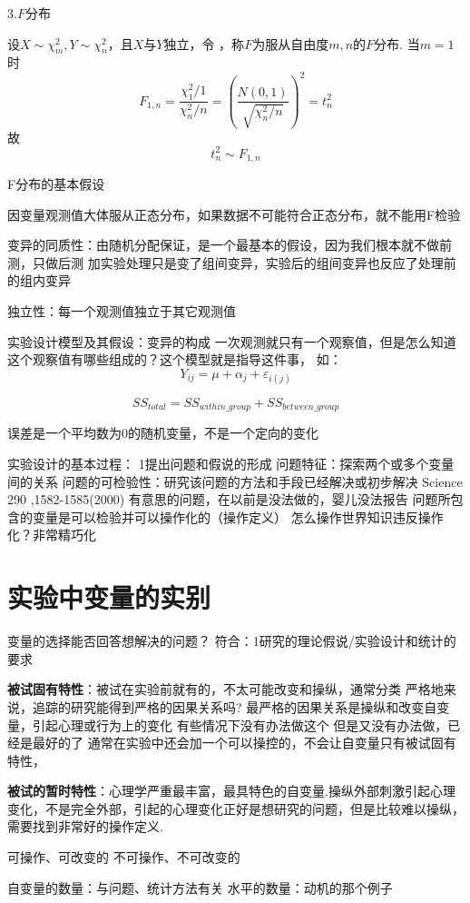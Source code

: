 3.$F$分布

设$X\sim \chi _{m}^{2},Y\sim \chi _{n}^{2}$，且$X$与$Y$独立，令 ，称$F$为服从自由度$m,n$的$F$分布.
当$m=1$时
$$
F_{1,n}=\frac{\chi _{1}^{2}/1}{\chi _{n}^{2}/n}=\left( \frac{N\left( 0,1 \right)}{\sqrt{\chi _{n}^{2}/n}} \right) ^2=t_{n}^{2}
$$
故
$$
t_{n}^{2}\sim F_{1,n}
$$

F分布的基本假设

因变量观测值大体服从正态分布，如果数据不可能符合正态分布，就不能用F检验
 
变异的同质性：由随机分配保证，是一个最基本的假设，因为我们根本就不做前测，只做后测
	加实验处理只是变了组间变异，实验后的组间变异也反应了处理前的组内变异
 
 独立性：每一个观测值独立于其它观测值 


实验设计模型及其假设：变异的构成
一次观测就只有一个观察值，但是怎么知道这个观察值有哪些组成的？这个模型就是指导这件事，
如：
$$
Y_{ij}=\mu +\alpha_j + \varepsilon_{i(j)}
$$

$$
SS_{total}=SS_{within\_group}+SS_{between\_group}
$$



误差是一个平均数为0的随机变量，不是一个定向的变化


实验设计的基本过程：
1提出问题和假说的形成
问题特征：探索两个或多个变量间的关系
问题的可检验性：研究该问题的方法和手段已经解决或初步解决
Science 290 ,1582-1585(2000) 有意思的问题，在以前是没法做的，婴儿没法报告
问题所包含的变量是可以检验并可以操作化的（操作定义）
怎么操作世界知识违反操作化？非常精巧化

\section{实验中变量的实别}
变量的选择能否回答想解决的问题？
符合：1研究的理论假说/实验设计和统计的要求

\textbf{被试固有特性}：被试在实验前就有的，不太可能改变和操纵，通常分类
严格地来说，追踪的研究能得到严格的因果关系吗?
最严格的因果关系是操纵和改变自变量，引起心理或行为上的变化
有些情况下没有办法做这个
但是又没有办法做，已经是最好的了
通常在实验中还会加一个可以操控的，不会让自变量只有被试固有特性，

\textbf{被试的暂时特性}：心理学严重最丰富，最具特色的自变量.操纵外部刺激引起心理变化，不是完全外部，引起的心理变化正好是想研究的问题，但是比较难以操纵，需要找到非常好的操作定义.

可操作、可改变的
不可操作、不可改变的

自变量的数量：与问题、统计方法有关
水平的数量：动机的那个例子

